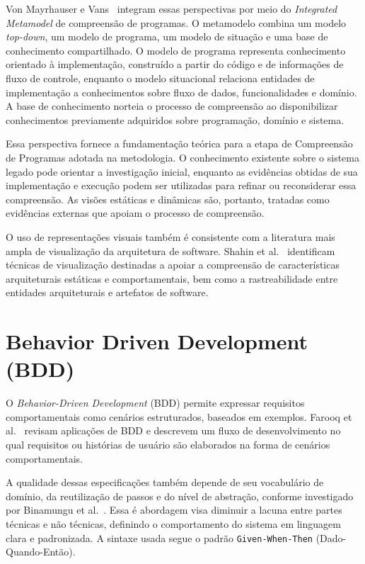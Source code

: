 Von Mayrhauser e Vans~\cite{von} integram essas perspectivas por meio do \textit{Integrated Metamodel} de compreensão de programas. O metamodelo combina um modelo \textit{top-down}, um modelo de programa, um modelo de situação e uma base de conhecimento compartilhado. O modelo de programa representa conhecimento orientado à implementação, construído a partir do código e de informações de fluxo de controle, enquanto o modelo situacional relaciona entidades de implementação a conhecimentos sobre fluxo de dados, funcionalidades e domínio. A base de conhecimento norteia o processo de compreensão ao disponibilizar conhecimentos previamente adquiridos sobre programação, domínio e sistema.

Essa perspectiva fornece a fundamentação teórica para a etapa de Compreensão de Programas adotada na metodologia. O conhecimento existente sobre o sistema legado pode orientar a investigação inicial, enquanto as evidências obtidas de sua implementação e execução podem ser utilizadas para refinar ou reconsiderar essa compreensão. As visões estáticas e dinâmicas são, portanto, tratadas como evidências externas que apoiam o processo de compreensão.

O uso de representações visuais também é consistente com a literatura mais ampla de visualização da arquitetura de software. Shahin et al.~\cite{Shahin2014} identificam técnicas de visualização destinadas a apoiar a compreensão de características arquiteturais estáticas e comportamentais, bem como a rastreabilidade entre entidades arquiteturais e artefatos de software.

\section{Behavior Driven Development (BDD)}

    O \textit{Behavior-Driven Development} (BDD) permite expressar requisitos comportamentais como cenários estruturados, baseados em exemplos. Farooq et al.~\cite{Farooq2023BDD} revisam aplicações de BDD e descrevem um fluxo de desenvolvimento no qual requisitos ou histórias de usuário são elaborados na forma de cenários comportamentais.

    A qualidade dessas especificações também depende de seu vocabulário de domínio, da reutilização de passos e do nível de abstração, conforme investigado por Binamungu et al.~\cite{Binamungu}.
    Essa é abordagem visa diminuir a lacuna entre partes técnicas e não técnicas, definindo o comportamento do sistema em linguagem clara e padronizada. A sintaxe usada segue o padrão \texttt{Given-When-Then} (Dado-Quando-Então).
    
